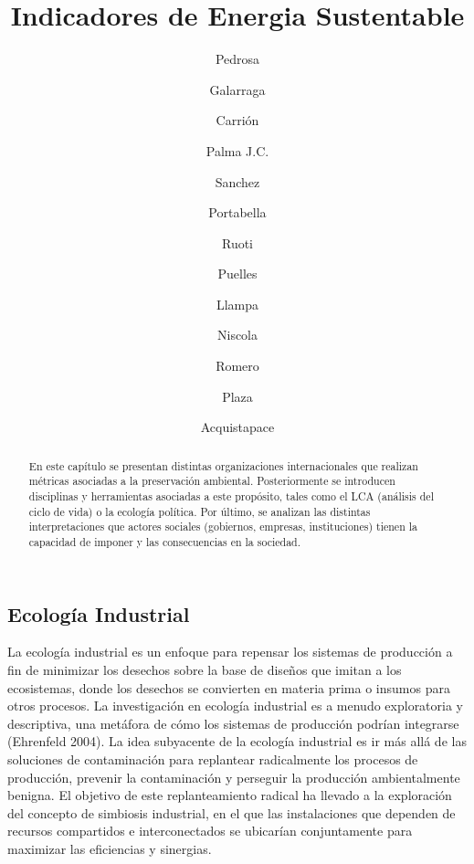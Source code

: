 \documentclass[runningheads]{llncs}
\begin{document}
\title{Indicadores de Energia Sustentable}
%
%

\author{Pedrosa %
\and
Galarraga%
\and
Carrión
\and
Palma J.C.
\and
Sanchez
\and
Portabella
\and
Ruoti
\and
Puelles
\and
Llampa
\and
Niscola 
\and
Romero
\and
Plaza
\and
Acquistapace}
%
%
%
%
%
\maketitle              
%
\setcounter{section}{6}

\begin{abstract}En este capítulo se presentan distintas organizaciones internacionales que realizan métricas asociadas a la preservación ambiental. Posteriormente se introducen disciplinas y herramientas asociadas a este propósito, tales como el LCA (análisis del ciclo de vida) o la ecología política. Por último, se analizan las distintas interpretaciones que actores sociales (gobiernos, empresas, instituciones) tienen la capacidad de imponer y las consecuencias en la sociedad.

\end{abstract}


\subsection {Ecología Industrial}
\bigskip
La ecología industrial es un enfoque para repensar los sistemas de producción a fin de minimizar los desechos sobre la base de diseños que imitan a los ecosistemas, donde los desechos se convierten en materia prima o insumos para otros procesos. La investigación en ecología industrial es a menudo exploratoria y descriptiva, una metáfora de cómo los sistemas de producción podrían integrarse (Ehrenfeld 2004). La idea subyacente de la ecología industrial es ir más allá de las soluciones de contaminación para replantear radicalmente los procesos de producción, prevenir la contaminación y perseguir la producción ambientalmente benigna. El objetivo de este replanteamiento radical ha llevado a la exploración del concepto de simbiosis industrial, en el que las instalaciones que dependen de recursos compartidos e interconectados se ubicarían conjuntamente para maximizar las eficiencias y sinergias.
\end{document}
